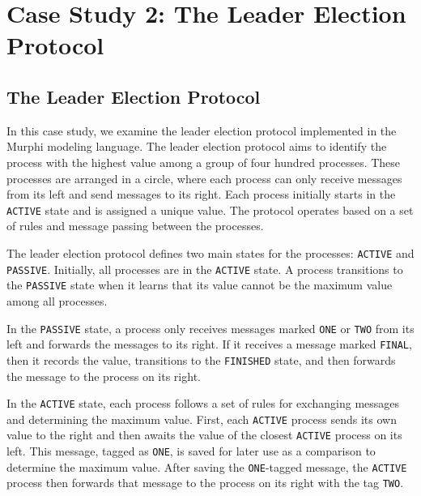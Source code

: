 
\section{Case Study 2: The Leader Election Protocol}\label{sec:leader-election}

\subsection{The Leader Election Protocol}\label{subsec:the-leader-election-protocol}

In this case study, we examine the leader election protocol implemented in
the Murphi modeling language.
The leader election protocol aims to identify the process with the highest
value among a group of four hundred processes.
These processes are arranged in a circle, where each process can only receive
messages from its left and send messages to its right.
Each process initially starts in the \texttt{ACTIVE} state and is assigned a
unique value.
The protocol operates based on a set of rules and message passing between the
processes.

The leader election protocol defines two main states for the processes:
\texttt{ACTIVE} and \texttt{PASSIVE}.
Initially, all processes are in the \texttt{ACTIVE} state.
A process transitions to the \texttt{PASSIVE} state when it learns that its
value cannot be the maximum value among all processes.

In the \texttt{PASSIVE} state, a process only receives messages marked
\texttt{ONE} or \texttt{TWO} from its left and forwards the messages to its
right.
If it receives a message marked \texttt{FINAL}, then it records the value,
transitions to the \texttt{FINISHED} state, and then forwards the message
to the process on its right.

In the \texttt{ACTIVE} state, each process follows a set of rules for
exchanging messages and determining the maximum value.
First, each \texttt{ACTIVE} process sends its own value to the right and then
awaits the value of the closest \texttt{ACTIVE} process on its left.
This message, tagged as \texttt{ONE}, is saved for later use as a comparison
to determine the maximum value.
After saving the \texttt{ONE}-tagged message, the \texttt{ACTIVE} process then
forwards that message to the process on its right with the tag \texttt{TWO}.

